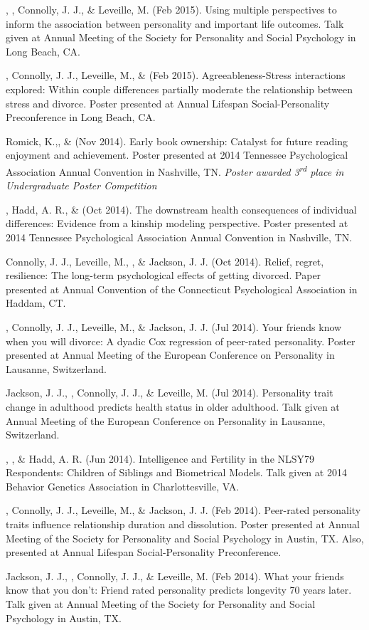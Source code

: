 \begin{etaremune}
%
\item \jjj, \meb, Connolly, J. J., \& Leveille, M. (Feb 2015). Using multiple perspectives to inform the association between personality and important life outcomes. Talk given at Annual Meeting of the Society for Personality and Social Psychology in Long Beach, CA.
%
\item\meb, Connolly, J. J., Leveille, M., \& \jjj (Feb 2015). Agreeableness-Stress interactions explored: Within couple differences partially moderate the relationship between stress and divorce. Poster presented at Annual Lifespan Social-Personality Preconference in Long Beach, CA.
%
\item Romick, K.,\noteA \meb, \& \joe (Nov 2014). Early book ownership: Catalyst for future reading enjoyment and achievement. Poster presented at 2014 Tennessee Psychological Association Annual Convention in  Nashville, TN. \textit{Poster awarded 3\textsuperscript{rd} place in Undergraduate Poster Competition}
%
\item\meb, Hadd, A. R., \& \joe (Oct 2014). The downstream health consequences of individual differences: Evidence from a kinship modeling perspective. Poster presented at 2014 Tennessee Psychological Association Annual Convention in Nashville, TN.
%
\item Connolly, J. J., Leveille, M., \meb, \& Jackson, J. J. (Oct 2014). Relief, regret, resilience: The long-term psychological effects of getting divorced. Paper presented at Annual Convention of the Connecticut Psychological Association in Haddam, CT.
%
\item\meb, Connolly, J. J., Leveille, M., \& Jackson, J. J. (Jul 2014). Your friends know when you will divorce: A dyadic Cox regression of peer-rated personality. Poster presented at Annual Meeting of the European Conference on Personality in Lausanne, Switzerland.
%
\item Jackson, J. J., \meb, Connolly, J. J., \& Leveille, M. (Jul 2014). Personality trait change in adulthood predicts health status in older adulthood. Talk given at Annual Meeting of the European Conference on Personality in Lausanne, Switzerland.
%
\item \joe, \meb, \& Hadd, A. R. (Jun 2014). Intelligence and Fertility in the NLSY79 Respondents: Children of Siblings and Biometrical Models. Talk given at 2014 Behavior Genetics Association in Charlottesville, VA.
%
\item\meb, Connolly, J. J., Leveille, M., \& Jackson, J. J. (Feb 2014). Peer-rated personality traits influence relationship duration and dissolution. Poster presented at Annual Meeting of the Society for Personality and Social Psychology in Austin, TX. Also, presented at Annual Lifespan Social-Personality Preconference.
%
\item Jackson, J. J., \meb, Connolly, J. J., \& Leveille, M. (Feb 2014). What your friends know that you don't: Friend rated personality predicts longevity 70 years later. Talk given at Annual Meeting of the Society for Personality and Social Psychology in Austin, TX.
%
\end{etaremune}

